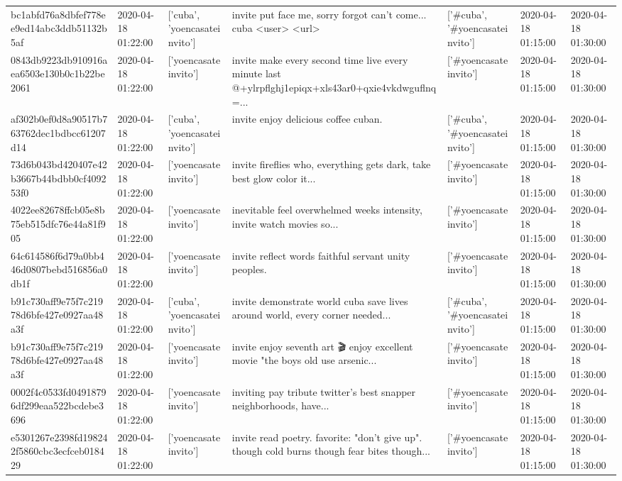 \begin{tabular}{lllllll}
bc1abfd76a8dbfef778ee9ed14abc3ddb51132b5af & 2020-04-18 01:22:00 & ['cuba', 'yoencasateinvito'] & invite put face me, sorry forgot can't come... cuba <user> <url> & ['#cuba', '#yoencasateinvito'] & 2020-04-18 01:15:00 & 2020-04-18 01:30:00 \\
0843db9223db910916aea6503e130b0c1b22be2061 & 2020-04-18 01:22:00 & ['yoencasateinvito'] & invite make every second time live every minute last @+ylrpflghj1epiqx+xls43ar0+qxie4vkdwguflnq=... & ['#yoencasateinvito'] & 2020-04-18 01:15:00 & 2020-04-18 01:30:00 \\
af302b0ef0d8a90517b763762dec1bdbcc61207d14 & 2020-04-18 01:22:00 & ['cuba', 'yoencasateinvito'] & invite enjoy delicious coffee cuban. & ['#cuba', '#yoencasateinvito'] & 2020-04-18 01:15:00 & 2020-04-18 01:30:00 \\
73d6b043bd420407e42b3667b44bdbb0cf409253f0 & 2020-04-18 01:22:00 & ['yoencasateinvito'] & invite fireflies who, everything gets dark, take best glow color it... & ['#yoencasateinvito'] & 2020-04-18 01:15:00 & 2020-04-18 01:30:00 \\
4022ee82678ffcb05e8b75eb515dfc76e44a81f905 & 2020-04-18 01:22:00 & ['yoencasateinvito'] & inevitable feel overwhelmed weeks intensity, invite watch movies so... & ['#yoencasateinvito'] & 2020-04-18 01:15:00 & 2020-04-18 01:30:00 \\
64c614586f6d79a0bb446d0807bebd516856a0db1f & 2020-04-18 01:22:00 & ['yoencasateinvito'] & invite reflect words faithful servant unity peoples. & ['#yoencasateinvito'] & 2020-04-18 01:15:00 & 2020-04-18 01:30:00 \\
b91c730aff9e75f7c21978d6bfe427e0927aa48a3f & 2020-04-18 01:22:00 & ['cuba', 'yoencasateinvito'] & invite demonstrate world cuba save lives around world, every corner needed... & ['#cuba', '#yoencasateinvito'] & 2020-04-18 01:15:00 & 2020-04-18 01:30:00 \\
b91c730aff9e75f7c21978d6bfe427e0927aa48a3f & 2020-04-18 01:22:00 & ['yoencasateinvito'] & invite enjoy seventh art 🎬 enjoy excellent movie "the boys old use arsenic... & ['#yoencasateinvito'] & 2020-04-18 01:15:00 & 2020-04-18 01:30:00 \\
0002f4c0533fd04918796df299eaa522bcdebe3696 & 2020-04-18 01:22:00 & ['yoencasateinvito'] & inviting pay tribute twitter's best snapper neighborhoods, have... & ['#yoencasateinvito'] & 2020-04-18 01:15:00 & 2020-04-18 01:30:00 \\
e5301267e2398fd198242f5860cbc3ecfceb018429 & 2020-04-18 01:22:00 & ['yoencasateinvito'] & invite read poetry. favorite: "don't give up". though cold burns though fear bites though... & ['#yoencasateinvito'] & 2020-04-18 01:15:00 & 2020-04-18 01:30:00 \\

\end{tabular}
